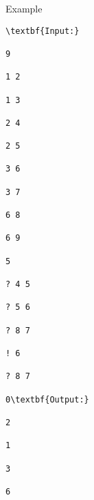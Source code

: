 Example
\begin{verbatim}
\textbf{Input:}

9

1 2

1 3

2 4

2 5

3 6

3 7

6 8

6 9

5

? 4 5

? 5 6

? 8 7

! 6

? 8 7

0\textbf{Output:}

2

1

3

6\end{verbatim}